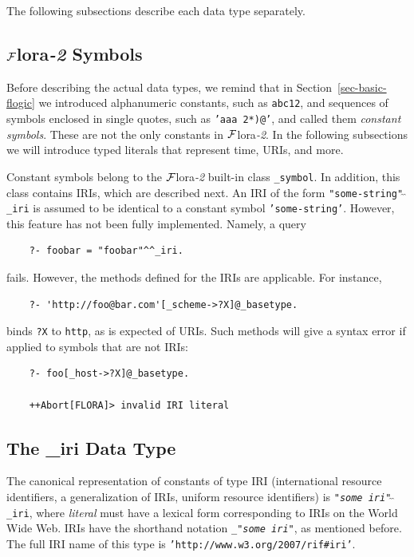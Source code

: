 \documentclass[11pt]{article}
\newcommand{\FLORA}{{\mbox{\sc ${\cal F}${lora}\rm\emph{-2}}}\xspace}
\begin{document}
The following subsections
describe each data type separately.

\subsection{\FLORA Symbols}

Before describing the actual data types, we remind that
in Section~\ref{sec-basic-flogic} we introduced
alphanumeric constants, such as {\tt abc12}, and sequences of symbols
enclosed in single quotes, such as {\tt 'aaa 2*)@'},  and called them
\emph{constant symbols}. These are not the only constants in \FLORA.
In the following subsections we will introduce typed literals that
represent time, URIs, and more. 

Constant symbols belong to the \FLORA built-in class {\tt \_symbol}.
In addition, this class contains IRIs, which are described next.
An IRI of the form {\tt "some-string"$\hat{~}\hat{~}$\_iri} is assumed to
be identical to
a constant symbol {\tt 'some-string'}. However, this feature has not been
fully implemented. Namely, a query
\begin{verbatim}
    ?- foobar = "foobar"^^_iri.
\end{verbatim}
fails. However, the methods defined for the IRIs are applicable. For
instance,
\begin{verbatim}
    ?- 'http://foo@bar.com'[_scheme->?X]@_basetype.
\end{verbatim}
binds {\tt ?X} to {\tt http}, as is expected of URIs.
Such methods will give a syntax error if applied to symbols that are not
IRIs:
\begin{verbatim}
    ?- foo[_host->?X]@_basetype.

    ++Abort[FLORA]> invalid IRI literal
\end{verbatim}


\subsection{The \_iri Data Type}\label{sec-uri}

The canonical representation of constants of type IRI (international
resource identifiers, a generalization of IRIs, uniform resource
identifiers) is
{\tt "\emph{some iri}"$\hat{~}\hat{~}$\_iri}, where \emph{literal} must have
a lexical form corresponding to IRIs on the World Wide Web. IRIs have the shorthand notation
{\tt \_"\emph{some iri}"}, as mentioned before. The full IRI name of this
type is {\tt 'http://www.w3.org/2007/rif\#iri'}. 
\end{document}
